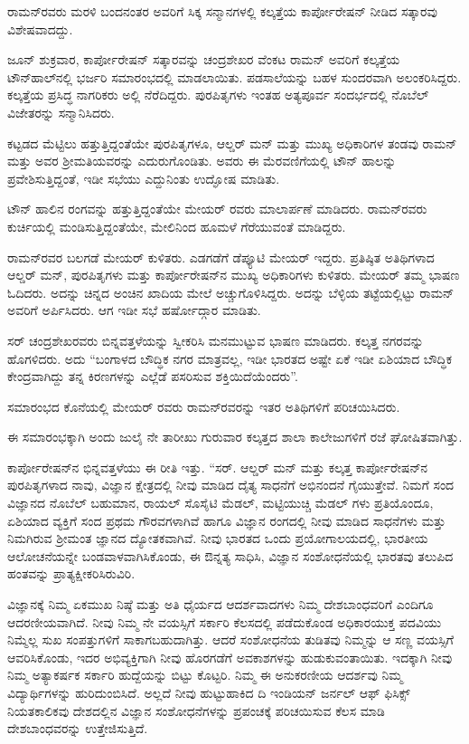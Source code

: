 
ರಾಮನ್‍ರವರು ಮರಳಿ ಬಂದನಂತರ ಅವರಿಗೆ ಸಿಕ್ಕ ಸನ್ಮಾನಗಳಲ್ಲಿ ಕಲ್ಕತ್ತೆಯ ಕಾರ್ಪೋರೇಷನ್ ನೀಡಿದ ಸತ್ಕಾರವು ವಿಶೇಷವಾದದ್ದು.

ಜೂನ್  ಶುಕ್ರವಾರ, ಕಾರ್ಪೋರೇಷನ್ ಸತ್ಕಾರವನ್ನು ಚಂದ್ರಶೇಖರ ವೆಂಕಟ ರಾಮನ್ ಅವರಿಗೆ ಕಲ್ಕತ್ತೆಯ ಟೌನ್‍ಹಾಲ್‍ನಲ್ಲಿ ಭರ್ಜರಿ ಸಮಾರಂಭದಲ್ಲಿ ಮಾಡಲಾಯಿತು. ಪಡಸಾಲೆಯನ್ನು ಬಹಳ ಸುಂದರವಾಗಿ ಅಲಂಕರಿಸಿದ್ದರು. ಕಲ್ಕತ್ತೆಯ ಪ್ರಸಿದ್ಧ ನಾಗರಿಕರು ಅಲ್ಲಿ ನೆರೆದಿದ್ದರು. ಪುರಪಿತೃಗಳು ಇಂತಹ ಅತ್ಯಪೂರ್ವ ಸಂದರ್ಭದಲ್ಲಿ ನೊಬೆಲ್ ವಿಜೇತರನ್ನು ಸನ್ಮಾನಿಸಿದರು.

ಕಟ್ಟಡದ ಮೆಟ್ಟಿಲು ಹತ್ತುತ್ತಿದ್ದಂತೆಯೇ ಪುರಪಿತೃಗಳೂ, ಆಲ್ಡರ್ ಮನ್ ಮತ್ತು ಮುಖ್ಯ ಅಧಿಕಾರಿಗಳ ತಂಡವು ರಾಮನ್ ಮತ್ತು ಅವರ ಶ‍್ರೀಮತಿಯವರನ್ನು ಎದುರುಗೊಂಡಿತು. ಅವರು ಈ ಮೆರವಣಿಗೆಯಲ್ಲಿ ಟೌನ್ ಹಾಲನ್ನು ಪ್ರವೇಶಿಸುತ್ತಿದ್ದಂತೆ, ಇಡೀ ಸಭೆಯು ಎದ್ದುನಿಂತು ಉದ್ಘೋಷ ಮಾಡಿತು.

ಟೌನ್ ಹಾಲಿನ ರಂಗವನ್ನು ಹತ್ತುತ್ತಿದ್ದಂತೆಯೇ ಮೇಯರ್ ರವರು ಮಾಲಾರ್ಪಣೆ ಮಾಡಿದರು. ರಾಮನ್‍ರವರು ಕುರ್ಚಿಯಲ್ಲಿ ಮಂಡಿಸುತ್ತಿದ್ದಂತೆಯೇ, ಮೇಲಿನಿಂದ ಹೂಮಳೆ ಗೆರೆಯುವಂತೆ ಮಾಡಿದ್ದರು.

ರಾಮನ್‍ರವರ ಬಲಗಡೆ ಮೇಯರ್ ಕುಳಿತರು. ಎಡಗಡೆಗೆ ಡೆಪ್ಯೂಟಿ ಮೇಯರ್ ಇದ್ದರು. ಪ್ರತಿಷ್ಠಿತ ಅತಿಥಿಗಳಾದ ಆಲ್ಡರ್ ಮನ್, ಪುರಪಿತೃಗಳು ಮತ್ತು ಕಾರ್ಪೋರೇಷನ್‍ನ ಮುಖ್ಯ ಅಧಿಕಾರಿಗಳು ಕುಳಿತರು. ಮೇಯರ್ ತಮ್ಮ ಭಾಷಣ ಓದಿದರು. ಅದನ್ನು ಚಿನ್ನದ ಅಂಚಿನ ಖಾದಿಯ ಮೇಲೆ ಅಚ್ಚುಗೊಳಿಸಿದ್ದರು. ಅದನ್ನು ಬೆಳ್ಳಿಯ ತಟ್ಟೆಯಲ್ಲಿಟ್ಟು ರಾಮನ್ ಅವರಿಗೆ ಅರ್ಪಿಸಿದರು. ಆಗ ಇಡೀ ಸಭೆ ಹರ್ಷೋದ್ಗಾರ ಮಾಡಿತು.

ಸರ್ ಚಂದ್ರಶೇಖರವರು ಬಿನ್ನವತ್ತಳೆಯನ್ನು ಸ್ವೀಕರಿಸಿ ಮನಮುಟ್ಟುವ ಭಾಷಣ ಮಾಡಿದರು. ಕಲ್ಕತ್ತ ನಗರವನ್ನು ಹೊಗಳಿದರು. ಅದು “ಬಂಗಾಳದ ಬೌದ್ಧಿಕ ನಗರ ಮಾತ್ರವಲ್ಲ, ಇಡೀ ಭಾರತದ ಅಷ್ಟೇ ಏಕೆ ಇಡೀ ಏಶಿಯಾದ ಬೌದ್ಧಿಕ ಕೇಂದ್ರವಾಗಿದ್ದು ತನ್ನ ಕಿರಣಗಳನ್ನು ಎಲ್ಲೆಡೆ ಪಸರಿಸುವ ಶಕ್ತಿಯಿದೆಯೆಂದರು”.

ಸಮಾರಂಭದ ಕೊನೆಯಲ್ಲಿ ಮೇಯರ್ ರವರು ರಾಮನ್‍ರವರನ್ನು ಇತರ ಅತಿಥಿಗಳಿಗೆ ಪರಿಚಯಿಸಿದರು.

ಈ ಸಮಾರಂಭಕ್ಕಾಗಿ ಅಂದು ಜುಲೈ ನೇ ತಾರೀಖು ಗುರುವಾರ ಕಲ್ಕತ್ತದ ಶಾಲಾ ಕಾಲೇಜುಗಳಿಗೆ ರಜೆ ಘೋಷಿತವಾಗಿತ್ತು.

ಕಾರ್ಪೋರೇಷನ್‍ನ ಭಿನ್ನವತ್ತಳೆಯು ಈ ರೀತಿ ಇತ್ತು. “ಸರ್. ಆಲ್ಡರ್ ಮನ್ ಮತ್ತು ಕಲ್ಕತ್ತ ಕಾರ್ಪೋರೇಷನ್‍ನ ಪುರಪಿತೃಗಳಾದ ನಾವು, ವಿಜ್ಞಾನ ಕ್ಷೇತ್ರದಲ್ಲಿ ನೀವು ಮಾಡಿದ ದೈತ್ಯ ಸಾಧನೆಗೆ ಅಭಿನಂದನೆ ಗೈಯುತ್ತೇವೆ. ನಿಮಗೆ ಸಂದ ವಿಜ್ಞಾನದ ನೊಬೆಲ್ ಬಹುಮಾನ, ರಾಯಲ್ ಸೊಸೈಟಿ ಮೆಡಲ್, ಮಟ್ಟಿಯುಚ್ಚಿ ಮೆಡಲ್ ಗಳು ಪ್ರತಿಯೊಂದೂ, ಏಶಿಯಾದ ವ್ಯಕ್ತಿಗೆ ಸಂದ ಪ್ರಥಮ ಗೌರವಗಳಾಗಿವೆ ಹಾಗೂ ವಿಜ್ಞಾನ ರಂಗದಲ್ಲಿ ನೀವು ಮಾಡಿದ ಸಾಧನೆಗಳು ಮತ್ತು ನಿಮಗಿರುವ ಶ‍್ರೀಮಂತ ಜ್ಞಾನದ ದ್ಯೋತಕವಾಗಿವೆ. ನೀವು ಭಾರತದ ಒಂದು ಪ್ರಯೋಗಾಲಯದಲ್ಲಿ, ಭಾರತೀಯ ಆಲೋಚನೆಯನ್ನೇ ಬಂಡವಾಳವಾಗಿಸಿಕೊಂಡು, ಈ ಔನ್ನತ್ಯ ಸಾಧಿಸಿ, ವಿಜ್ಞಾನ ಸಂಶೋಧನೆಯಲ್ಲಿ ಭಾರತವು ತಲುಪಿದ ಹಂತವನ್ನು ಪ್ರಾತ್ಯಕ್ಷೀಕರಿಸಿರುವಿರಿ.

ವಿಜ್ಞಾನಕ್ಕೆ ನಿಮ್ಮ ಏಕಮುಖ ನಿಷ್ಠೆ ಮತ್ತು ಅತಿ ಧೈರ್ಯದ ಆದರ್ಶವಾದಗಳು ನಿಮ್ಮ ದೇಶಬಾಂಧವರಿಗೆ ಎಂದಿಗೂ ಆದರಣೀಯವಾಗಿದೆ. ನೀವು ನಿಮ್ಮ ನೇ ವಯಸ್ಸಿಗೆ ಸರ್ಕಾರಿ ಕೆಲಸದಲ್ಲಿ ಪಡೆದುಕೊಂಡ ಅಧಿಕಾರಯುಕ್ತ ಪದವಿಯು ನಿಮ್ಮೆಲ್ಲ ಸುಖ ಸಂಪತ್ತುಗಳಿಗೆ ಸಾಕಾಗಬಹುದಾಗಿತ್ತು. ಆದರೆ ಸಂಶೋಧನೆಯ ತುಡಿತವು ನಿಮ್ಮನ್ನು ಆ ಸಣ್ಣ ವಯಸ್ಸಿಗೆ ಆವರಿಸಿಕೊಂಡು, ಇದರ ಅಭಿವ್ಯಕ್ತಿಗಾಗಿ ನೀವು ಹೊರಗಡೆಗೆ ಅವಕಾಶಗಳನ್ನು ಹುಡುಕುವಂತಾಯಿತು. ಇದಕ್ಕಾಗಿ ನೀವು ನಿಮ್ಮ ಅತ್ಯಾಕರ್ಷಕ ಸರ್ಕಾರಿ ಹುದ್ದೆಯನ್ನು ಬಿಟ್ಟು ಕೊಟ್ಟರಿ. ನಿಮ್ಮ ಈ ಅನುಕರಣೀಯ ಆದರ್ಶವು ನಿಮ್ಮ ವಿದ್ಯಾರ್ಥಿಗಳನ್ನು ಹುರಿದುಂಬಿಸಿದೆ. ಅಲ್ಲದೆ ನೀವು ಹುಟ್ಟುಹಾಕಿದ ದಿ ಇಂಡಿಯನ್ ಜರ್ನಲ್ ಆಫ್ ಫಿಸಿಕ್ಸ್ ನಿಯತಕಾಲಿಕವು ದೇಶದಲ್ಲಿನ ವಿಜ್ಞಾನ ಸಂಶೋಧನೆಗಳನ್ನು ಪ್ರಪಂಚಕ್ಕೆ ಪರಿಚಯಿಸುವ ಕೆಲಸ ಮಾಡಿ ದೇಶಬಾಂಧವರನ್ನು ಉತ್ತೇಜಿಸುತ್ತಿದೆ.

